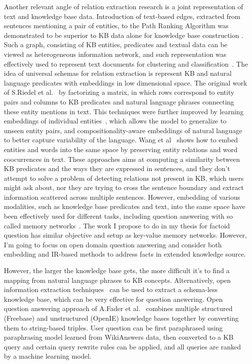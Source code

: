 Another relevant angle of relation extraction research is a joint representation of text and knowledge base data.
Introduction of text-based edges, extracted from sentences mentioning a pair of entities, to the Path Ranking Algorithm was demonstrated to be superior to KB data alone for knowledge base construction \cite{lao2012reading}.
Such a graph, consisting of KB entities, predicates and textual data can be viewed as heterogeneous information network, and such representation was effectively used to represent text documents for clustering and classification~\cite{wang2016text,wang2015incorporating}.
The idea of universal schemas for relation extraction is represent KB and natural language predicates with embeddings in low dimensional space.
The original work of S.Riedel et al.~\cite{riedel2013relation} by factorizing a matrix, in which rows correspond to entity pairs and columns to KB predicates and natural language phrases connecting these entity mentions in text.
This techniques were further improved by learning embeddings of individual entities~\cite{verga2016row}, which allows the model to generalize to unseen entity pairs, and compositionality-aware embeddings of natural language~\cite{toutanova2015representing} to better capture variability of the language.
Wang et al~\cite{wang2014knowledge} shows how to embed entities and words into the same space by preserving entity relations and word coocurrences in text.
These approaches aims at computing a similarity between KB predicates and the ways they are expressed in sentences, and they don't attempt to solve a problem of detecting relations not present in KB, which users might ask about, nor they are trying to cross the sentence boundary and extract information scattered across multiple sentences.
However, embedding of various modalities, such as knowledge base predicates and text, into the same space have been effectively used for different tasks, including question answering with so called memory networks~\cite{bordes2015large,miller2016key}.
The work I propose to do in my thesis for factoid question has similar objective and setup as key-value memory networks.
However, I'm going to focus on open domain question answering and consider both embedding and IR-based methods to address facts in extended knowledge source.

However, the larger the knowledge base gets, the more difficult it's to find a mapping from natural language phrases to KB concepts.
Alternatively, open information extraction techniques~\cite{Etzioni:2008:OIE:1409360.1409378} can be used to extract a schema-less knowledge base, which can be very effective for question answering.
Open question answering approach of A.Fader et al.~\cite{Fader:2014:OQA:2623330.2623677,yin2015answering} combines multiple structured (Freebase) and unstructured (OpenIE) knowledge bases together by converting them to string-based triples.
User question can be first paraphrased using paraphrasing model learned from WikiAnswers data, then converted to a KB query and certain query rewrite rules can be applied, and all queries are ranked by a machine learning model.

